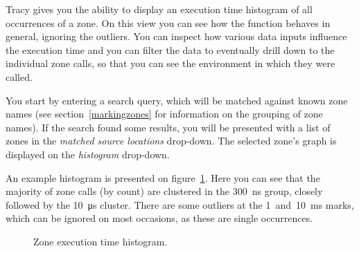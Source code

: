 \documentclass[hidelinks,titlepage,a4paper]{article}
\begin{document}
Tracy gives you the ability to display an execution time histogram of all occurrences of a zone. On this view you can see how the function behaves in general, ignoring the outliers. You can inspect how various data inputs influence the execution time and you can filter the data to eventually drill down to the individual zone calls, so that you can see the environment in which they were called.

You start by entering a search query, which will be matched against known zone names (see section~\ref{markingzones} for information on the grouping of zone names). If the search found some results, you will be presented with a list of zones in the \emph{matched source locations} drop-down. The selected zone's graph is displayed on the \emph{histogram} drop-down.

An example histogram is presented on figure~\ref{findzonehistogram}. Here you can see that the majority of zone calls (by count) are clustered in the 300~\si{\nano\second} group, closely followed by the 10~\si{\micro\second} cluster. There are some outliers at the 1~and~10~\si{\milli\second} marks, which can be ignored on most occasions, as these are single occurrences.

\begin{figure}[h]
\centering{}
\caption{Zone execution time histogram.}
\label{findzonehistogram}
\end{figure}
\end{document}
